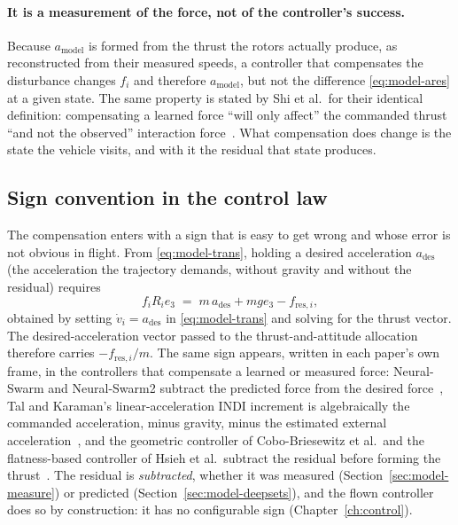 \paragraph{It is a measurement of the force, not of the controller's success.} Because
$a_{\mathrm{model}}$ is formed from the thrust the rotors actually produce, as reconstructed from
their measured speeds, a controller that compensates the disturbance changes $f_i$ and therefore
$a_{\mathrm{model}}$, but not the difference \eqref{eq:model-ares} at a given state. The same
property is stated by Shi et al.\ for their identical definition: compensating a learned force
``will only affect'' the commanded thrust ``and not the observed'' interaction
force~\cite{shi2020neuralswarm}. What compensation does change is the state the vehicle visits,
and with it the residual that state produces.

\subsection{Sign convention in the control law}
\label{sec:model-sign}

The compensation enters with a sign that is easy to get wrong and whose error is not obvious in
flight. From \eqref{eq:model-trans}, holding a desired acceleration $a_{\mathrm{des}}$ (the acceleration the
trajectory demands, without gravity and without the residual) requires
%
\begin{equation}
  f_i R_i e_3 \;=\; m\,a_{\mathrm{des}} + m g e_3 - f_{\mathrm{res},i},
  \label{eq:model-sign}
\end{equation}
%
obtained by setting $\dot v_i = a_{\mathrm{des}}$ in \eqref{eq:model-trans} and solving for the
thrust vector. The desired-acceleration vector passed to the thrust-and-attitude allocation
therefore carries $-f_{\mathrm{res},i}/m$. The same sign appears, written in each paper's own frame,
in the controllers that compensate a learned or measured force: Neural-Swarm and Neural-Swarm2
subtract the predicted force from the desired
force~\cite{shi2020neuralswarm,shi2022neuralswarm2}, Tal and Karaman's linear-acceleration INDI
increment is algebraically the commanded acceleration, minus gravity, minus the estimated external
acceleration~\cite{tal2018indi}, and the geometric controller of Cobo-Briesewitz et al.\ and the
flatness-based controller of Hsieh et al.\ subtract the residual before forming the
thrust~\cite{cobobriesewitz2026lindi,hsieh2026flatness}.
The residual is \emph{subtracted}, whether it was measured
(Section~\ref{sec:model-measure}) or predicted (Section~\ref{sec:model-deepsets}), and the flown
controller does so by construction: it has no configurable sign (Chapter~\ref{ch:control}).


